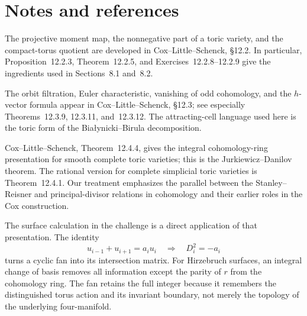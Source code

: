 \clearpage
\section*{Notes and references}

The projective moment map, the nonnegative part of a toric variety,
and the compact-torus quotient are developed in
Cox--Little--Schenck, \S12.2. In particular, Proposition~12.2.3,
Theorem~12.2.5, and Exercises~12.2.8--12.2.9 give the ingredients used
in Sections~8.1 and~8.2.

The orbit filtration, Euler characteristic, vanishing of odd
cohomology, and the \(h\)-vector formula appear in
Cox--Little--Schenck, \S12.3; see especially
Theorems~12.3.9, 12.3.11, and~12.3.12. The attracting-cell language
used here is the toric form of the Bia\l ynicki--Birula decomposition.

Cox--Little--Schenck, Theorem~12.4.4, gives the integral
cohomology-ring presentation for smooth complete toric varieties; this
is the Jurkiewicz--Danilov theorem. The rational version for complete
simplicial toric varieties is Theorem~12.4.1. Our treatment emphasizes
the parallel between the Stanley--Reisner and principal-divisor
relations in cohomology and their earlier roles in the Cox
construction.

The surface calculation in the challenge is a direct application of
that presentation. The identity
\[
u_{i-1}+u_{i+1}=a_i u_i
\quad\Longrightarrow\quad
D_i^2=-a_i
\]
turns a cyclic fan into its intersection matrix. For Hirzebruch
surfaces, an integral change of basis removes all information except
the parity of \(r\) from the cohomology ring. The fan retains the full
integer because it remembers the distinguished torus action and its
invariant boundary, not merely the topology of the underlying
four-manifold.
